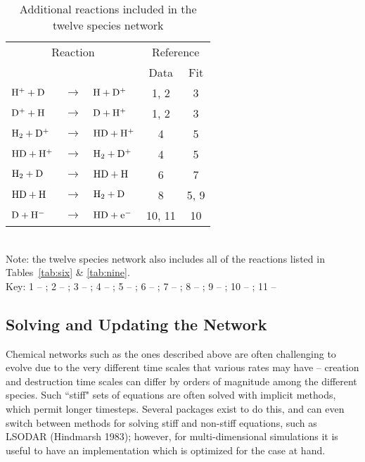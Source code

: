 \begin{table}
\caption{Additional reactions included in the twelve species network \label{tab:12}}
\begin{tabular}{lclcc}
\hline
\multicolumn{3}{c}{Reaction} & \multicolumn{2}{c}{Reference} \\
& & & Data & Fit \\
\hline
${\rm H^{+} + D}$ & $\rightarrow$ & ${\rm H + D^{+}}$ & 1, 2 & 3 \\
${\rm D^{+} + H}$ & $\rightarrow$ & ${\rm D + H^{+}}$ & 1, 2 & 3 \\
${\rm H_{2} + D^{+}}$ & $\rightarrow$ & ${\rm HD + H^{+}}$ & 4 & 5 \\
${\rm HD + H^{+}}$ & $\rightarrow$ & ${\rm H_{2} + D^{+}}$ & 4 & 5 \\
${\rm H_{2} + D}$ & $\rightarrow$ & ${\rm HD + H}$ & 6 & 7 \\
${\rm HD + H}$ & $\rightarrow$ & ${\rm H_{2} + D}$ & 8 & 5, 9 \\
${\rm D + H^{-}}$ & $\rightarrow$ & ${\rm HD + e^{-}}$ & 10, 11 & 10  \\
\hline
\end{tabular}
\\ Note: the twelve species network also includes all of the reactions listed in Tables~\ref{tab:six} \& \ref{tab:nine}.
\\ Key: 1 -- \citet{1999PhRvL..83.4041I}; 2 -- \citet{2000PhRvA..62d2706Z}; 3 -- \citet{2002ApJ...566..599S};
4 -- \citet{1982sasp.nasa..304G}; 5 -- \citet{2002P&SS...50.1197G}; 6 -- \citet{2003PhRvL..91f3201M}; 7 -- \citet{2011ApJ...727..110C}; 
8 -- \citet{1959JChPh..31.1359S}; 9 -- \citet{2007MNRAS.376..709R}; 10 -- \citet{2010Sci...329...69K}; 11 -- \citet{2012PhRvA..86c2714M}
\end{table}


\subsection{Solving and Updating the Network}

Chemical networks such as the ones described above are often challenging to evolve due to the very different time scales that various rates may have -- creation and destruction time scales can differ by orders of magnitude among the different species.   Such ``stiff" sets of equations are often solved with implicit methods, which permit longer timesteps.  Several packages exist to do this, and can even switch between methods for solving stiff and non-stiff equations, such as LSODAR (Hindmarsh 1983); however, for multi-dimensional simulations it is useful to have an implementation which is optimized for the case at hand.

